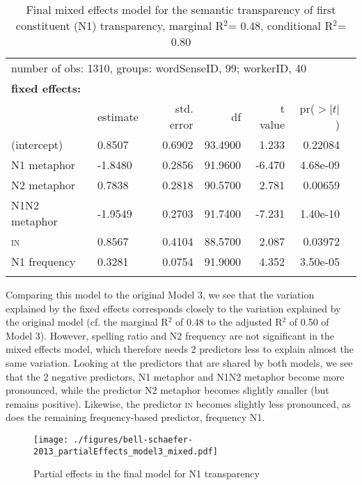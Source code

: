 \begin{table}[!htb]
\begin{tabularx}{.95\textwidth}{llrrrrr}
\multicolumn{7}{l}{number of obs: 1310, groups:  wordSenseID, 99; workerID, 40}\\[1ex]
% 
% 
\multicolumn{7}{l}{\textbf{fixed effects:}}\\
             &{estimate}&{std. error}&      {df}&{t value}&{pr($>|t|$)}\\\midrule   
(intercept)   & 0.8507   &0.6902&93.4900& 1.233& 0.22084\\   
N1 metaphor  &-1.8480   &0.2856&91.9600&-6.470&4.68e-09\\
N2 metaphor  & 0.7838   &0.2818&90.5700& 2.781& 0.00659\\
N1N2 metaphor &-1.9549   &0.2703&91.7400&-7.231&1.40e-10\\
\textsc{in}         & 0.8567   &0.4104&88.5700& 2.087& 0.03972\\
N1 frequency     & 0.3281   &0.0754&91.9000& 4.352&3.50e-05\\\lspbottomrule
\end{tabularx}
  \caption{Final mixed effects model for the semantic transparency of
    first constituent (N1) transparency, marginal R$^2$= 0.48, conditional R$^2$= 0.80
}
  \label{tab:mixed-model3-bellschaefer2013}
\end{table}

Comparing this model to the original Model 3, we see that the
variation explained by the fixed effects corresponds closely to the
variation explained by the original model (cf. the marginal R$^2$ of
0.48 to the adjusted R$^2$ of 0.50 of Model 3). However, spelling
ratio and N2 frequency are not significant in the mixed
effects model, which therefore needs 2 predictors less to explain
almost the
same variation. Looking at the predictors that are shared by both
models, we see that the 2 negative predictors, N1 metaphor and N1N2
metaphor become more pronounced, while the predictor N2 metaphor
becomes slightly smaller (but remains positive). Likewise, the
predictor \textsc{in} becomes slightly less pronounced, as does the  
remaining frequency-based predictor, frequency N1.

\begin{figure}[!htb]
  \centering
\texttt{[image: ./figures/bell-schaefer-2013\_partialEffects\_model3\_mixed.pdf]}
  
  \caption{Partial effects in the final model for N1 transparency}
\label{fig:bellschaefer2013_model_3-mixed-effects}
\end{figure}

